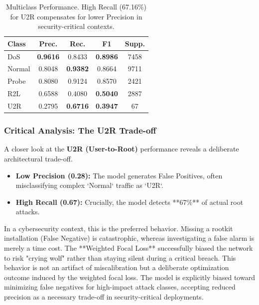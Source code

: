 \documentclass[
  10pt,
  twocolumn,
  a4paper,
  parskip=half
]{scrartcl}
\begin{document}
\begin{table}[ht] %
    \centering
    \scriptsize %
    \renewcommand{\arraystretch}{1.2}
    \setlength{\tabcolsep}{3pt} %
    \caption{Multiclass Performance. High Recall (67.16\%) for U2R compensates for lower Precision in security-critical contexts.}
    \label{tab:multiclass}
    \begin{tabularx}{\columnwidth}{Xcccc}
        \toprule
        \textbf{Class} & \textbf{Prec.} & \textbf{Rec.} & \textbf{F1} & \textbf{Supp.} \\
        \midrule
        DoS    & \textbf{0.9616} & 0.8433 & \textbf{0.8986} & 7458 \\
        Normal & 0.8048 & \textbf{0.9382} & 0.8664 & 9711 \\
        Probe  & 0.8080 & 0.9124 & 0.8570 & 2421 \\
        \rowcolor{yellow!10} R2L & 0.6588 & 0.4080 & \textbf{0.5040} & 2887 \\
        \rowcolor{red!10} U2R & 0.2795 & \textbf{0.6716} & \textbf{0.3947} & 67 \\
        \bottomrule
    \end{tabularx}
\end{table}

    \subsubsection{Critical Analysis: The U2R Trade-off}
    A closer look at the \textbf{U2R (User-to-Root)} performance reveals a deliberate architectural trade-off.
    \begin{itemize}
        \item \textbf{Low Precision (0.28):} The model generates False Positives, often misclassifying complex `Normal` traffic as `U2R`.
        \item \textbf{High Recall (0.67):} Crucially, the model detects **67\%** of actual root attacks.
    \end{itemize}
    In a cybersecurity context, this is the preferred behavior. Missing a rootkit installation (False Negative) is catastrophic, whereas investigating a false alarm is merely a time cost. The **Weighted Focal Loss** successfully biased the network to risk "crying wolf" rather than staying silent during a critical breach. This behavior is not an artifact of miscalibration but a deliberate optimization outcome induced by the weighted focal loss. The model is explicitly biased toward minimizing false negatives for high-impact attack classes, accepting reduced precision as a necessary trade-off in security-critical deployments.
\end{document}
